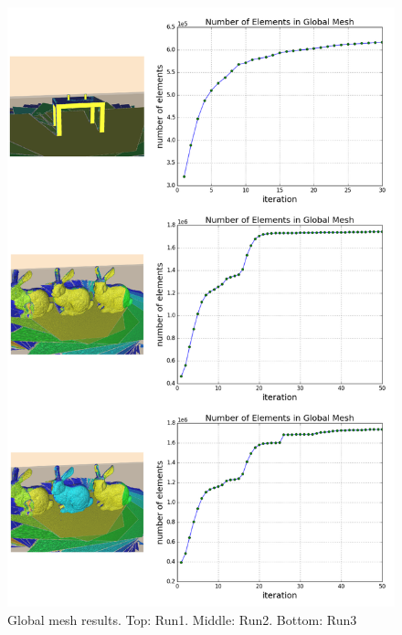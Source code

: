 \begin{figure}[h]%
\centering
  \includegraphics[width=\textwidth]{figures/diagram_run123_gm.png}
  \caption{Global mesh results. Top: Run1. Middle: Run2. Bottom: Run3}
  \label{fig:gm}
\end{figure}
